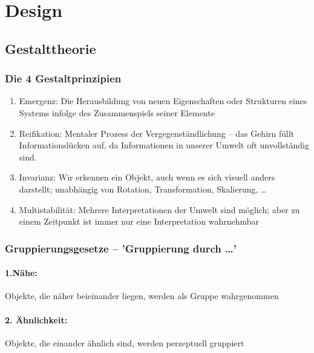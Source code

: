 \section{Design}
	\subsection{Gestalttheorie}
		\subsubsection{Die 4 Gestaltprinzipien}
			\begin{enumerate}
				\item Emergenz: Die Herausbildung von neuen Eigenschaften oder Strukturen eines Systems
				infolge des Zusammenspiels seiner Elemente

				
				\item Reifikation: Mentaler Prozess der Vergegenständlichung -- das Gehirn füllt Informationslücken auf, da Informationen in unserer Umwelt oft unvollständig sind.
				
				\item Invarianz: Wir erkennen ein Objekt, auch wenn es sich visuell anders darstellt; unabhängig von Rotation, Transformation, Skalierung, \ldots
				
				\item Multistabilität: Mehrere Interpretationen der Umwelt sind möglich; aber zu einem Zeitpunkt ist immer nur eine Interpretation wahrnehmbar \biglb
			\end{enumerate}
		
		\subsubsection{Gruppierungsgesetze -- 'Gruppierung durch \ldots'}
			\paragraph{1.Nähe:} Objekte, die näher beieinander liegen, werden als Gruppe wahrgenommen
				
			\paragraph{2. Ähnlichkeit:} Objekte, die einander ähnlich sind, werden perzeptuell gruppiert
		
		\pagebreak
				
